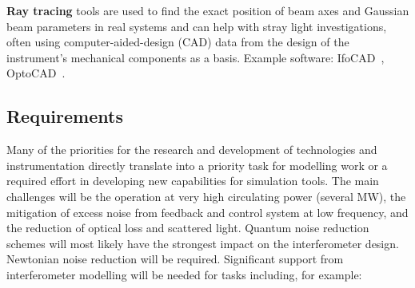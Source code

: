 \textbf{Ray tracing} tools are used to find the exact position of beam axes and Gaussian beam parameters in real systems and can help with stray light investigations, often using computer-aided-design (CAD) data from the design of the instrument's mechanical components as a basis. Example software: IfoCAD~\cite{IfoCAD, kochkina}, OptoCAD~\cite{OptoCAD}.

\subsection{Requirements}
\label{sec:Sim:Req}
Many of the priorities for the research and development of technologies and instrumentation directly translate into a priority task for modelling work or a required effort in developing new capabilities for simulation tools. The main challenges will be the operation at very high circulating power (several MW), the mitigation of excess noise from feedback and control system at low frequency, and the reduction of optical loss and scattered light. Quantum noise reduction schemes will most likely have the strongest impact on the interferometer design. Newtonian noise reduction will be required. Significant support from interferometer modelling will be needed
for tasks including, for example:
